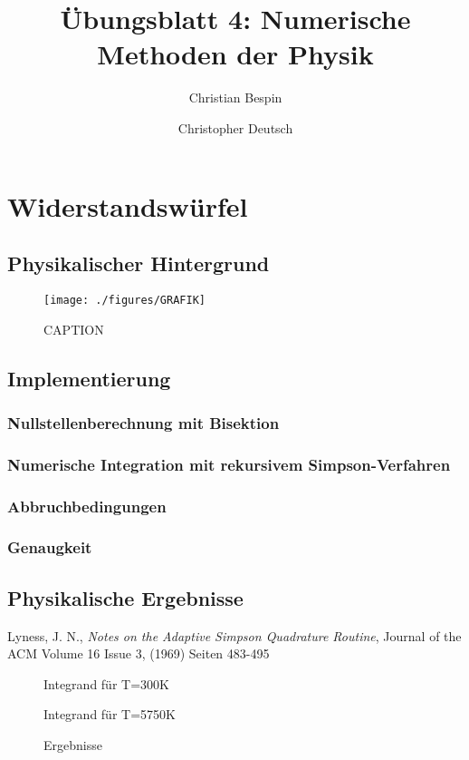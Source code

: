 \documentclass[10pt,a4paper]{article}
\author{Christian Bespin \and Christopher Deutsch}
\title{Übungsblatt 4: Numerische Methoden der Physik}
\begin{document}
\maketitle

\setcounter{section}{1}

\section{Widerstandswürfel}

\subsection{Physikalischer Hintergrund}

\begin{wrapfigure}[14]{R}[1pt]{0.47\textwidth}
\centering
\texttt{[image: ./figures/GRAFIK]}
\caption{CAPTION}
\label{fig:CAPTION}
\end{wrapfigure}

\subsection{Implementierung}

\subsubsection{Nullstellenberechnung mit Bisektion}

\subsubsection{Numerische Integration mit rekursivem Simpson-Verfahren}


\subsubsection{Abbruchbedingungen}

\subsubsection{Genaugkeit}

\subsection{Physikalische Ergebnisse}
\begin{thebibliography}{9}

 Lyness, J. N.,
 \emph{Notes on the Adaptive Simpson Quadrature Routine},
Journal of the ACM
Volume 16 Issue 3, (1969) 
Seiten 483-495 

\end{thebibliography}

\appendix

\begin{figure}[htbp]
\centering

\caption{Integrand für T=300K}


\caption{Integrand für T=5750K}
\end{figure}

\begin{figure}
\centering

\caption{Ergebnisse}
\label{fig:ergebnisse}
\end{figure}
\end{document}
